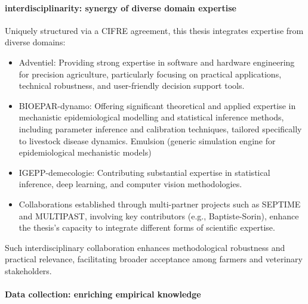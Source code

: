 \paragraph{interdisciplinarity: synergy of diverse domain expertise }

Uniquely structured via a CIFRE agreement, this thesis integrates expertise from diverse domains:  
\begin{itemize}
    \item Adventiel: Providing strong expertise in software and hardware engineering for precision agriculture, particularly focusing on practical applications, technical robustness, and user-friendly decision support tools.
    \item BIOEPAR-dynamo: Offering significant theoretical and applied expertise in mechanistic epidemiological modelling and statistical inference methods, including parameter inference and calibration techniques, tailored specifically to livestock disease dynamics. Emulsion (generic simulation engine for epidemiological mechanistic models)
    \item IGEPP-demecologie: Contributing substantial expertise in statistical inference, deep learning, and computer vision methodologies.
    \item Collaborations established through multi-partner projects such as SEPTIME and MULTIPAST, involving key contributors (e.g., Baptiste-Sorin), enhance the thesis’s capacity to integrate different forms of scientific expertise.
\end{itemize}
Such interdisciplinary collaboration enhances methodological robustness and practical relevance, facilitating broader acceptance among farmers and veterinary stakeholders.


\paragraph{Data collection: enriching empirical knowledge}

